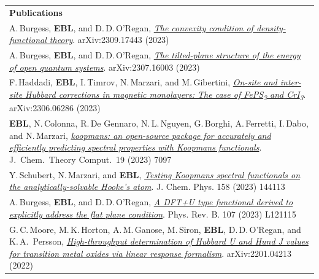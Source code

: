 \documentclass[10pt,a4paper,final]{article}
\begin{document}
\begin{tabularx}{\textwidth}{
   X}
   \rowcolor{seaborn_blue}
      \large\textcolor{seaborn_bg_grey_half}{\textbf{Publications}} \\
   \footnotesize A.\,Burgess, \textbf{EBL}, and D.\,D.\,O'Regan, \href{https://arxiv.org/abs/2309.17443}{\textit{The convexity condition of density-functional theory}}. arXiv:2309.17443 (2023)
   \\
   \footnotesize A.\,Burgess, \textbf{EBL}, and D.\,D.\,O'Regan, \href{https://arxiv.org/abs/2307.16003}{\textit{The tilted-plane structure of the energy of open quantum systems}}. arXiv:2307.16003 (2023)
   \\
   \footnotesize F.\,Haddadi, \textbf{EBL}, I.\,Timrov, N.\,Marzari, and M.\,Gibertini, \href{https://arxiv.org/abs/2306.06286}{\textit{On-site and inter-site Hubbard corrections in magnetic monolayers: The case of FePS\textsubscript{3} and CrI\textsubscript{3}}}. arXiv:2306.06286 (2023)
   \\
   \footnotesize \textbf{EBL}, N.\,Colonna, R.\,De Gennaro, N.\,L.\,Nguyen, G.\,Borghi, A.\,Ferretti, I.\,Dabo, and N.\,Marzari, \href{https://doi.org/10.1021/acs.jctc.3c00652}{\textit{koopmans: an open-source package for accurately and efficiently predicting spectral properties with Koopmans functionals}}. J.\ Chem.\  Theory Comput.\ 19 (2023) 7097
   \\
   \footnotesize Y.\,Schubert, N.\,Marzari, and \textbf{EBL}, \href{https://doi.org/10.1063/5.0138610}{\textit{Testing Koopmans spectral functionals on the analytically-solvable Hooke's atom}}. J. Chem. Phys. 158 (2023) 144113
   \\
   \footnotesize A.\,Burgess, \textbf{EBL}, and D.\,D.\,O'Regan, \href{https://doi.org/10.1103/PhysRevB.107.L121115}{\textit{A DFT+U type functional derived to explicitly address the flat plane condition}}. Phys. Rev. B. 107 (2023) L121115
   \\
   \footnotesize G.\,C.\,Moore, M.\,K.\,Horton, A.\,M.\,Ganose, M.\,Siron, \textbf{EBL}, D.\,D.\,O'Regan, and K.\,A.\, Persson, \href{https://arxiv.org/abs/2201.04213}{\textit{High-throughput determination of Hubbard U and Hund J values for transition metal oxides via linear response formalism}}. arXiv:2201.04213 (2022) \\

\end{tabularx}
\end{document}
